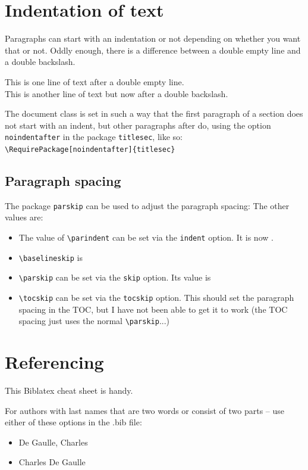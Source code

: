 \documentclass[main_brownies.tex]{subfiles}
\begin{document}
\section{Indentation of text}
Paragraphs can start with an indentation or not depending on whether you want that or not. Oddly enough, there is a difference between a double empty line and a double backslash.

This is one line of text after a double empty line.\\
This is another line of text but now after a double backslash.

The document class is set in such a way that the first paragraph of a section does not start with an indent, but other paragraphs after do, using the option \verb*|noindentafter| in the package \verb*|titlesec|, like so:
\verb*|\RequirePackage[noindentafter]{titlesec}|

\subsection{Paragraph spacing}
The package \verb|parskip| can be used to adjust the paragraph spacing:  The other values are:
\begin{itemize}
	\item The value of \verb|\parindent| can be set via the \texttt{indent} option. It is now \texttt{\the\parindent}.
	\item \verb|\baselineskip| is \texttt{\the\baselineskip}
	\item \verb|\parskip| can be set via the \texttt{skip} option. Its value is \texttt{\the\parskip}
	\item \verb|\tocskip| can be set via the \texttt{tocskip} option. This should set the paragraph spacing in the TOC, but I have not been able to get it to work (the TOC spacing just uses the normal \verb|\parskip|...)
\end{itemize}

\section{Referencing}
This Biblatex cheat sheet is handy.\cite{BiblatexCheatSheet}

For authors with last names that are two words or consist of two parts -- use either of these options in the .bib file:\cite{BibTwowordlastname}
\begin{itemize}
	\item De Gaulle, Charles
	\item Charles {De Gaulle}
\end{itemize}
\end{document}

